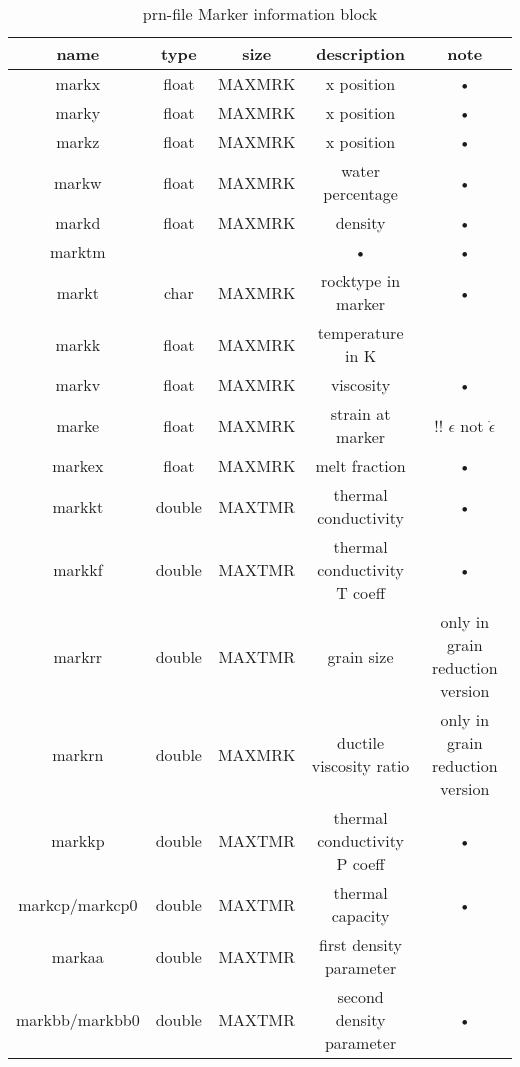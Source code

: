 \begin{table}[H]
\small
\centering
\begin{tabular}{c c c c c}
\toprule
name & type & size & description & note \\ 
\midrule
markx & float & MAXMRK & x position & • \\
marky & float & MAXMRK & x position & • \\
markz & float & MAXMRK & x position & • \\
markw & float & MAXMRK & water percentage & • \\ 
markd & float & MAXMRK & density & • \\
marktm & & & • & • \\ 
markt & char & MAXMRK & rocktype in marker & • \\ 

markk & float & MAXMRK & temperature in K &  \\ 

markv & float & MAXMRK & viscosity & • \\ 

marke & float & MAXMRK & strain at marker &  !! $\epsilon$ not $\dot{\epsilon}$ \\ 

markex & float & MAXMRK & melt fraction & • \\ 

markkt & double & MAXTMR & thermal conductivity & • \\

markkf & double & MAXTMR & thermal conductivity T coeff & • \\

markrr & double & MAXTMR & grain size & only in grain reduction version \\

markrn & double & MAXMRK & ductile viscosity ratio & only in grain reduction version \\

markkp & double & MAXTMR & thermal conductivity P coeff & • \\ 

markcp/markcp0 & double & MAXTMR & thermal capacity & • \\ 

markaa & double & MAXTMR & first density parameter &  \\ 

markbb/markbb0 & double & MAXTMR & second density parameter & • \\ 
\bottomrule
\end{tabular}
\caption{prn-file Marker information block}
\label{tbl:prn_marker_info}
\end{table}

